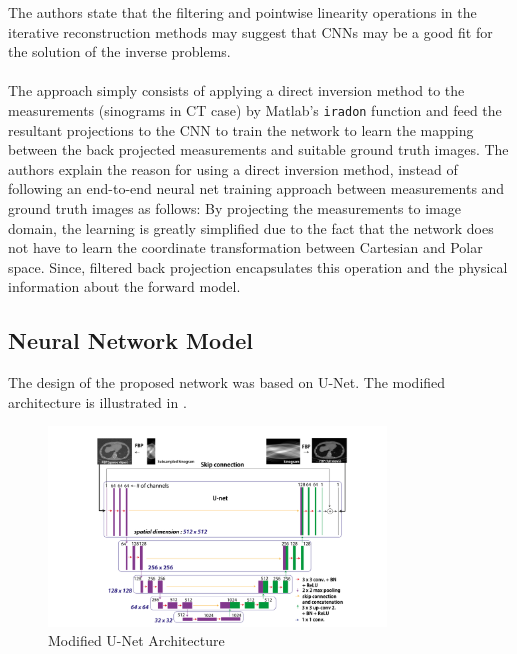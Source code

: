 \documentclass[journal, onecolumn, 11pt]{IEEEtran}
\begin{document}
The authors state that the filtering and pointwise linearity operations in the iterative reconstruction methods may suggest that CNNs may be a good fit for the solution of the inverse problems. 
\\
\\
The approach simply consists of applying a direct inversion method to the measurements (sinograms in CT case) by Matlab's \texttt{iradon} function and feed the resultant projections to the CNN to train the network to learn the mapping between the back projected measurements and suitable ground truth images. 
The authors explain the reason for using a direct inversion method, instead of following an end-to-end neural net training approach between measurements and ground truth images as follows: 
By projecting the measurements to image domain, the learning is greatly simplified due to the fact that the network does not have to learn the coordinate transformation between Cartesian and Polar space. Since, filtered back projection encapsulates this operation and the physical information about the forward model. 

\subsection{Neural Network Model}

The design of the proposed network was based on U-Net. The modified architecture is illustrated in .

\begin{figure}[h]
\centering
\includegraphics[width=0.8\textwidth]{images/unet.png}
\caption{Modified U-Net Architecture}\label{fig:Unet}
\end{figure}
\end{document}
